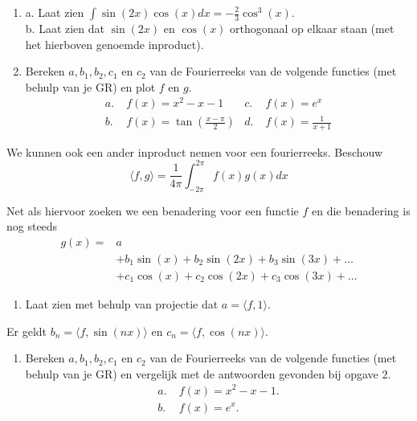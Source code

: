\documentclass[../main.tex]{subfiles}
\begin{document}
\begin{opdrachtlang}
\begin{enumerate}
    \item a. Laat zien $\int \sin(2x)\cos(x) dx=-\frac{2}{3}\cos^3(x)$.\\
    b. Laat zien dat $\sin(2x)$ en $\cos(x)$ orthogonaal op elkaar staan (met het hierboven genoemde inproduct).
    \item Bereken $a, b_1,b_2,c_1$ en $c_2$ van de Fourierreeks van de volgende functies (met behulp van je GR) en plot $f$ en $g$. \begin{align*}
        a.\;& f(x)=x^2-x-1
        & c.\;& f(x)=e^{x}\\
        b.\;& f(x)=\tan(\frac{x-\pi}{2})
        & d.\;& f(x)=\frac{1}{x+1}
    \end{align*}
\end{enumerate}

We kunnen ook een ander inproduct nemen voor een fourierreeks. Beschouw \[\langle f,g\rangle=\frac{1}{4\pi}\int_{-2\pi}^{2\pi} f(x)g(x)dx\]

Net als hiervoor zoeken we een benadering voor een functie $f$ en die benadering is nog steeds
    \begin{align*}
        g(x)=&a\\
        &+b_1\sin(x)+b_2\sin(2x)+b_3\sin(3x)+\ldots\\
        &+c_1\cos(x)+c_2\cos(2x)+c_3\cos(3x)+\ldots
    \end{align*}
\begin{enumerate}[resume]
\item Laat zien met behulp van projectie dat $a=\langle f,1\rangle$.
\end{enumerate}

Er geldt $b_n=\langle f,\sin(nx)\rangle$ en $c_n=\langle f,\cos(nx)\rangle$. 
\begin{enumerate}[resume]
\item Bereken $a, b_1,b_2,c_1$ en $c_2$ van de Fourierreeks van de volgende functies (met behulp van je GR) en vergelijk met de antwoorden gevonden bij opgave $2$.
   \begin{align*}
a.\;& f(x)=x^2-x-1.\\
b.\;& f(x)=e^x.\\
    \end{align*}
    
\end{enumerate}
\end{opdrachtlang}
%
\end{document}
